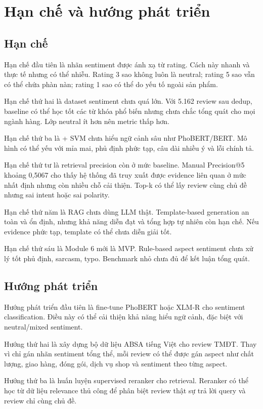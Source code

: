 \chapter{Hạn chế và hướng phát triển}
\section{Hạn chế}
Hạn chế đầu tiên là nhãn sentiment được ánh xạ từ rating. Cách này nhanh và thực tế nhưng có thể nhiễu. Rating 3 sao không luôn là neutral; rating 5 sao vẫn có thể chứa phàn nàn; rating 1 sao có thể do yếu tố ngoài sản phẩm.

Hạn chế thứ hai là dataset sentiment chưa quá lớn. Với 5.162 review sau dedup, baseline có thể học tốt các từ khóa phổ biến nhưng chưa chắc tổng quát cho mọi ngành hàng. Lớp neutral ít hơn nên metric thấp hơn.

Hạn chế thứ ba là \TFIDF{} + SVM chưa hiểu ngữ cảnh sâu như PhoBERT/BERT. Mô hình có thể yếu với mỉa mai, phủ định phức tạp, câu dài nhiều ý và lỗi chính tả.

Hạn chế thứ tư là retrieval precision còn ở mức baseline. Manual Precision@5 khoảng 0,5067 cho thấy hệ thống đã truy xuất được evidence liên quan ở mức nhất định nhưng còn nhiều chỗ cải thiện. Top-k có thể lấy review cùng chủ đề nhưng sai intent hoặc sai polarity.

Hạn chế thứ năm là RAG chưa dùng LLM thật. Template-based generation an toàn và ổn định, nhưng khả năng diễn đạt và tổng hợp tự nhiên còn hạn chế. Nếu evidence phức tạp, template có thể chưa diễn giải tốt.

Hạn chế thứ sáu là Module 6 mới là MVP. Rule-based aspect sentiment chưa xử lý tốt phủ định, sarcasm, typo. Benchmark nhỏ chưa đủ để kết luận tổng quát.

\section{Hướng phát triển}
Hướng phát triển đầu tiên là fine-tune PhoBERT hoặc XLM-R cho sentiment classification. Điều này có thể cải thiện khả năng hiểu ngữ cảnh, đặc biệt với neutral/mixed sentiment.

Hướng thứ hai là xây dựng bộ dữ liệu ABSA tiếng Việt cho review TMĐT. Thay vì chỉ gán nhãn sentiment tổng thể, mỗi review có thể được gán aspect như chất lượng, giao hàng, đóng gói, dịch vụ shop và sentiment theo từng aspect.

Hướng thứ ba là huấn luyện supervised reranker cho retrieval. Reranker có thể học từ dữ liệu relevance thủ công để phân biệt review thật sự trả lời query và review chỉ cùng chủ đề.


